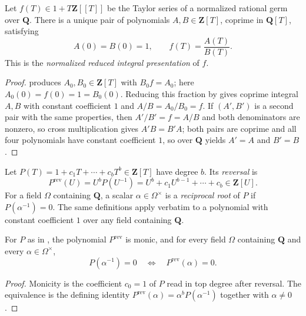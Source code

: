 \begin{theorem}
\label{thm:zla-integral-fatou}
\leanok
Let $f(T)\in1+T\mathbf Z[[T]]$ be the Taylor series of a normalized rational
germ over $\mathbf Q$.  There is a unique pair of polynomials
$A,B\in\mathbf Z[T]$, coprime in $\mathbf Q[T]$, satisfying
\[
  A(0)=B(0)=1,
  \qquad
  f(T)=\frac{A(T)}{B(T)}.
\]
This is the \emph{normalized reduced integral presentation} of $f$.
\end{theorem}
\begin{proof}
\leanok
{} produces $A_0,B_0\in\mathbf Z[T]$ with
$B_0f=A_0$; here $A_0(0)=f(0)=1=B_0(0)$.  Reducing this fraction by
 gives coprime integral $A,B$ with
constant coefficient $1$ and $A/B=A_0/B_0=f$.  If $(A',B')$ is a second pair
with the same properties, then $A'/B'=f=A/B$ and both denominators are nonzero,
so cross multiplication gives $A'B=B'A$; both pairs are coprime and all four
polynomials have constant coefficient $1$, so
 over $\mathbf Q$ yields $A'=A$ and
$B'=B$.
\end{proof}

\begin{definition}
\label{def:zla-reversal}
\leanok
Let $P(T)=1+c_1T+\cdots+c_bT^b\in\mathbf Z[T]$ have degree $b$.  Its
\emph{reversal} is
\[
  P^{\mathrm{rev}}(U)=U^bP(U^{-1})=U^b+c_1U^{b-1}+\cdots+c_b\in\mathbf Z[U].
\]
For a field $\Omega$ containing $\mathbf Q$, a scalar
$\alpha\in\Omega^\times$ is a \emph{reciprocal root} of $P$ if
$P(\alpha^{-1})=0$.  The same definitions apply verbatim to a polynomial with
constant coefficient $1$ over any field containing $\mathbf Q$.
\end{definition}

\begin{lemma}
\label{lem:zla-reversal-roots}
\leanok
For $P$ as in , the polynomial $P^{\mathrm{rev}}$ is
monic, and for every field $\Omega$ containing $\mathbf Q$ and every
$\alpha\in\Omega^\times$,
\[
  P(\alpha^{-1})=0
  \quad\Longleftrightarrow\quad
  P^{\mathrm{rev}}(\alpha)=0.
\]
\end{lemma}
\begin{proof}
\leanok
Monicity is the coefficient $c_0=1$ of $P$ read in top degree after reversal.
The equivalence is the defining identity
$P^{\mathrm{rev}}(\alpha)=\alpha^bP(\alpha^{-1})$ together with
$\alpha\neq0$.
\end{proof}


